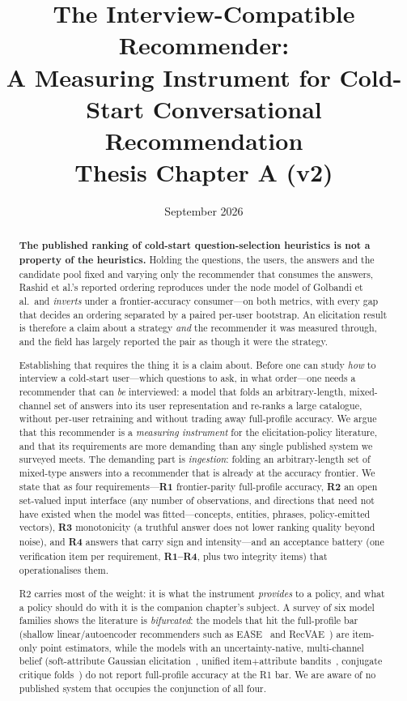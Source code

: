 \documentclass[11pt]{article}
\title{\textbf{The Interview-Compatible Recommender:\\A Measuring Instrument for Cold-Start Conversational Recommendation}\\[4pt]\large Thesis Chapter A (v2)}
\author{}
\date{September 2026}
\begin{document}
\maketitle

\begin{abstract}
\noindent \textbf{The published ranking of cold-start question-selection heuristics is not a property of the
heuristics.} Holding the questions, the users, the answers and the candidate pool fixed and varying only the
recommender that consumes the answers, Rashid et al.'s reported ordering reproduces under the node model of
Golbandi et al.\ and \emph{inverts} under a frontier-accuracy consumer---on both metrics, with every gap that
decides an ordering separated by a paired per-user bootstrap. An elicitation result is therefore a claim about a
strategy \emph{and} the recommender it was measured through, and the field has largely reported the pair as though
it were the strategy.

Establishing that requires the thing it is a claim about. Before one can study \emph{how} to interview a cold-start
user---which questions to ask, in what
order---one needs a recommender that can \emph{be} interviewed: a model that folds an arbitrary-length,
mixed-channel set of answers into its user representation and re-ranks a large catalogue, without per-user retraining and
without trading away full-profile accuracy. We argue that this recommender is a \emph{measuring instrument} for the
elicitation-policy literature, and that its requirements are more demanding than any single published system we
surveyed meets. The demanding part is \emph{ingestion}: folding an arbitrary-length set of mixed-type answers into a recommender
that is already at the accuracy frontier. We state that as four requirements---\textbf{R1} frontier-parity
full-profile accuracy, \textbf{R2} an open set-valued input interface (any number of observations, and directions
that need not have existed when the model was fitted---concepts, entities, phrases, policy-emitted vectors),
\textbf{R3} monotonicity (a truthful answer does not lower ranking
quality beyond noise), and \textbf{R4} answers that carry sign and intensity---and an
acceptance battery (one verification item per requirement, \textbf{R1--R4}, plus two integrity items) that
operationalises them.

R2 carries most of the weight: it is what the instrument \emph{provides} to a policy, and what
a policy should do with it is the companion chapter's subject. A survey of six model families shows the literature is \emph{bifurcated}: the models that hit
the full-profile bar (shallow linear/autoencoder recommenders such as EASE~\cite{steck2019ease} and
RecVAE~\cite{ren2020recvae}) are item-only point estimators, while the models with an uncertainty-native, multi-channel
belief (soft-attribute Gaussian elicitation~\cite{biyik2023soft}, unified item$+$attribute bandits~\cite{li2021seamlessly},
conjugate critique folds~\cite{toroghi2023bcie}) do not report full-profile accuracy at the R1 bar. We are aware of no
published system that occupies the conjunction of all four.


\end{abstract}
\end{document}
